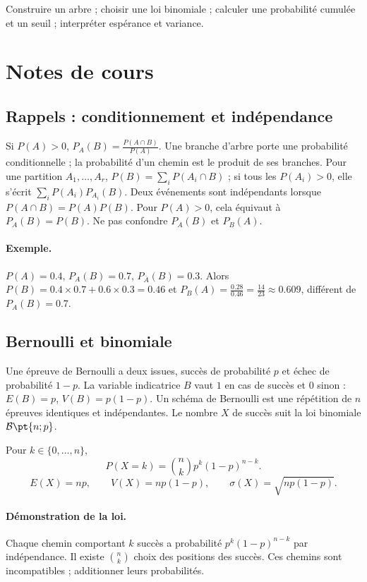 \label{ch:13}


\begin{keypoint}[Objectifs]Construire un arbre ; choisir une loi binomiale ; calculer une probabilité cumulée et un seuil ; interpréter espérance et variance.\end{keypoint}

\section{Notes de cours}
\subsection{Rappels : conditionnement et indépendance}
Si $P(A)>0$, $P_A(B)=\frac{P(A\cap B)}{P(A)}$. Une branche d'arbre porte une probabilité conditionnelle ; la probabilité d'un chemin est le produit de ses branches. Pour une partition $A_1,\ldots,A_r$, $P(B)=\sum_iP(A_i\cap B)$ ; si tous les $P(A_i)>0$, elle s'écrit $\sum_iP(A_i)P_{A_i}(B)$.
Deux événements sont indépendants lorsque $P(A\cap B)=P(A)P(B)$. Pour $P(A)>0$, cela équivaut à $P_A(B)=P(B)$. Ne pas confondre $P_A(B)$ et $P_B(A)$.
\paragraph{Exemple.} $P(A)=\num{0,4}$, $P_A(B)=\num{0,7}$, $P_{\overline A}(B)=\num{0,3}$. Alors $P(B)=\num{0,4}\times\num{0,7}+\num{0,6}\times\num{0,3}=\num{0,46}$ et $P_B(A)=\frac{\num{0,28}}{\num{0,46}}=\frac{14}{23}\approx\num{0,609}$, différent de $P_A(B)=\num{0,7}$.
\subsection{Bernoulli et binomiale}
Une épreuve de Bernoulli a deux issues, succès de probabilité $p$ et échec de probabilité $1-p$. La variable indicatrice $B$ vaut $1$ en cas de succès et $0$ sinon : $E(B)=p$, $V(B)=p(1-p)$.
Un schéma de Bernoulli est une répétition de $n$ épreuves identiques et indépendantes. Le nombre $X$ de succès suit la loi binomiale $\mathcal B\pt{n;p}$.
\begin{keypoint}
Pour $k\in\{0,\ldots,n\}$,
\[P(X=k)=\binom nk p^k(1-p)^{n-k}.\]\[E(X)=np,\qquad V(X)=np(1-p),\qquad\sigma(X)=\sqrt{np(1-p)}.\]
\end{keypoint}
\paragraph{Démonstration de la loi.} Chaque chemin comportant $k$ succès a probabilité $p^k(1-p)^{n-k}$ par indépendance. Il existe $\binom nk$ choix des positions des succès. Ces chemins sont incompatibles ; additionner leurs probabilités.
